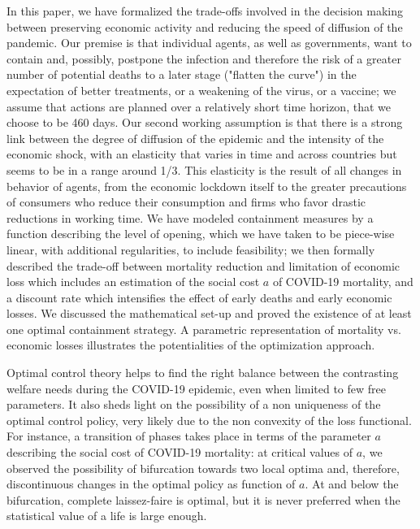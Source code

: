 \documentclass{amsart}
\begin{document}
In this paper, we have formalized the trade-offs involved in the decision making between preserving economic activity and reducing the speed of diffusion of the pandemic. Our premise is that individual agents, as well as governments, want to contain and, possibly, postpone the infection and therefore the risk of a greater number of potential deaths to a later stage ("flatten the curve") in the expectation of better treatments, or a weakening of the virus, or a vaccine; we 
assume that actions are planned over a relatively short time horizon, that we choose to be 460 days.  
Our second working assumption is that there is a strong link between the degree of diffusion of the epidemic and the intensity of the economic shock\color{black}, with an elasticity that varies in time and across countries but seems to be in a range around 1/3. This elasticity is the result of all changes in behavior of agents, from the economic lockdown itself to the greater precautions of consumers who reduce their consumption and firms who favor drastic reductions in working time. 
 We have modeled containment measures by a
 function describing the level of opening, which we have taken to be piece-wise linear,
with additional regularities, to include feasibility;
we then formally described the trade-off between mortality reduction
and limitation of economic loss which
includes an estimation of the social cost $a$ of COVID-19 mortality,
and a discount rate which intensifies the 
effect of early deaths and early economic losses. 
\color{black} We discussed the
mathematical set-up and  proved the existence of at least
one optimal containment strategy.
A parametric representation of  mortality vs.
economic losses illustrates the potentialities
of the optimization approach.

Optimal control theory helps to find the right balance between the contrasting 
welfare needs during the COVID-19 epidemic,
even when limited to few free parameters. It also sheds light on the possibility of a non uniqueness of the
optimal control policy, very likely due to
the non convexity of the loss functional.
For instance, a  transition of phases takes place 
in terms of the parameter $a$
describing the social cost of COVID-19 mortality: at 
critical values of $a$, we  observed
the possibility of bifurcation towards two local optima and, therefore, discontinuous changes in the optimal policy as
function of $a$.
At and below the bifurcation, complete laissez-faire
is optimal, but it is never preferred when the statistical value of a life is large enough.
\end{document}
